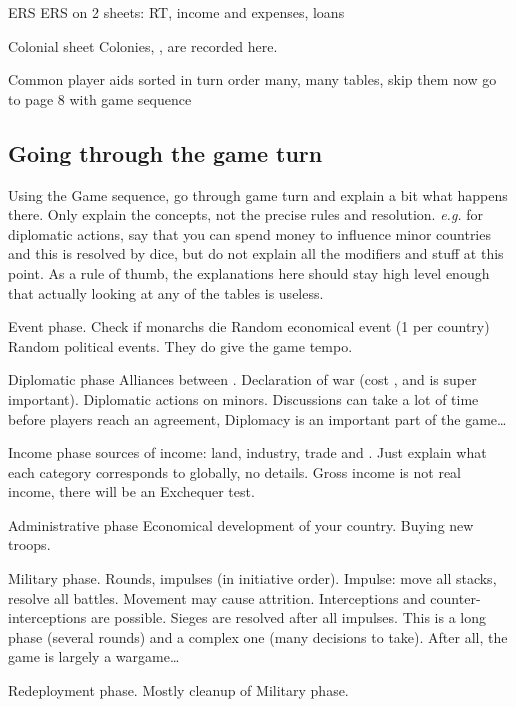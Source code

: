 \aparag ERS
 ERS on 2 sheets: RT, income and expenses, loans

\aparag Colonial sheet
\bparag Colonies, \TP, \TradeFLEET are recorded here.

\aparag Common player aids
\bparag sorted in turn order
\bparag many, many tables, skip them now
\bparag go to page 8 with game sequence

\subsection{Going through the game turn}
\aparag Using the Game sequence, go through game turn and explain a bit what
happens there.
\bparag Only explain the concepts, not the precise rules and resolution.
\bparag \emph{e.g.} for diplomatic actions, say that you can spend money to
influence minor countries and this is resolved by dice, but do not explain all
the modifiers and stuff at this point. As a rule of thumb, the explanations
here should stay high level enough that actually looking at any of the tables
is useless.

\aparag Event phase.
\bparag Check if monarchs die
\bparag Random economical event (1 per country)
\bparag Random political events. They do give the game tempo.

\aparag Diplomatic phase
\bparag Alliances between \MAJ.
\bparag Declaration of war (cost \STAB, and \STAB is super important).
\bparag Diplomatic actions on minors.
\bparag Discussions can take a lot of time before players reach an agreement,
Diplomacy is an important part of the game\ldots

\aparag Income phase
 sources of income: land, industry, trade and \ROTW.
\bparag Just explain what each category corresponds to globally, no details.
\bparag Gross income is not real income, there will be an Exchequer test.

\aparag Administrative phase
\bparag Economical development of your country.
\bparag Buying new troops.

\aparag Military phase.
\bparag Rounds, impulses (in initiative order).
\bparag Impulse: move all stacks, resolve all battles.
\bparag Movement may cause attrition.
\bparag Interceptions and counter-interceptions are possible.
\bparag Sieges are resolved after all impulses.
\bparag This is a long phase (several rounds) and a complex one (many
decisions to take). After all, the game is largely a wargame\ldots

\aparag Redeployment phase.
\bparag Mostly cleanup of Military phase.

